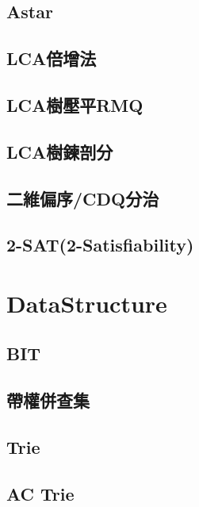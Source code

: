     \subsection{Astar}
         \columnbreak
    \subsection{LCA倍增法}
         \columnbreak
    \subsection{LCA樹壓平RMQ}
        
    \subsection{LCA樹鍊剖分}
         \columnbreak
    \subsection{二維偏序/CDQ分治}
         \columnbreak
    \subsection{2-SAT(2-Satisfiability)}
        
\clearpage

\section{DataStructure}
    \subsection{BIT}
        
    \subsection{帶權併查集}
         \columnbreak
    \subsection{Trie}
         \columnbreak
    \subsection{AC Trie}
         \columnbreak
